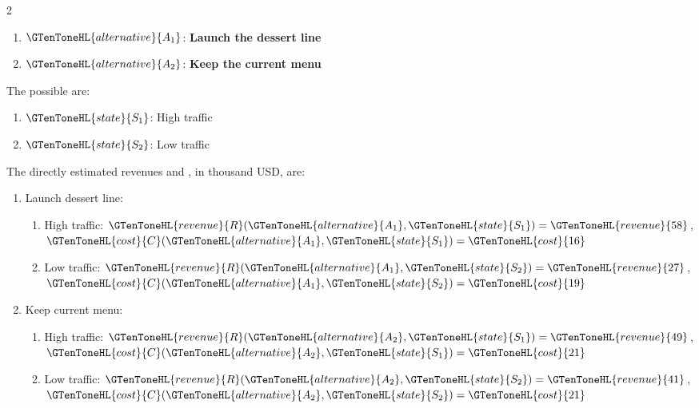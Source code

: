 \begin{multicols}{2}
	\begin{enumerate}[label=\arabic*.]
		\item \(\GTenToneHL{alternative}{A_1}\): \textbf{Launch the dessert line}
		\item \(\GTenToneHL{alternative}{A_2}\): \textbf{Keep the current menu}
	\end{enumerate}
	
	The possible    are:
	\begin{enumerate}[label=\arabic*.]
		\item \(\GTenToneHL{state}{S_1}\): High traffic
		\item \(\GTenToneHL{state}{S_2}\): Low traffic
	\end{enumerate}
	
	\columnbreak
	
	The directly estimated revenues and , in thousand USD, are:
	\begin{enumerate}[label=\arabic*.]
		\item Launch dessert line:
		\begin{enumerate}[label=\roman*)]
			\item High traffic:
			\(\GTenToneHL{revenue}{R}(\GTenToneHL{alternative}{A_1},\GTenToneHL{state}{S_1})=\GTenToneHL{revenue}{58}\), \(\GTenToneHL{cost}{C}(\GTenToneHL{alternative}{A_1},\GTenToneHL{state}{S_1})=\GTenToneHL{cost}{16}\)
			
			\item Low traffic:
			\(\GTenToneHL{revenue}{R}(\GTenToneHL{alternative}{A_1},\GTenToneHL{state}{S_2})=\GTenToneHL{revenue}{27}\), \(\GTenToneHL{cost}{C}(\GTenToneHL{alternative}{A_1},\GTenToneHL{state}{S_2})=\GTenToneHL{cost}{19}\)
		\end{enumerate}
		
		\item Keep current menu:
		\begin{enumerate}[label=\roman*)]
			\item High traffic:
			\(\GTenToneHL{revenue}{R}(\GTenToneHL{alternative}{A_2},\GTenToneHL{state}{S_1})=\GTenToneHL{revenue}{49}\), \(\GTenToneHL{cost}{C}(\GTenToneHL{alternative}{A_2},\GTenToneHL{state}{S_1})=\GTenToneHL{cost}{21}\)
			
			\item Low traffic:
			\(\GTenToneHL{revenue}{R}(\GTenToneHL{alternative}{A_2},\GTenToneHL{state}{S_2})=\GTenToneHL{revenue}{41}\), \(\GTenToneHL{cost}{C}(\GTenToneHL{alternative}{A_2},\GTenToneHL{state}{S_2})=\GTenToneHL{cost}{21}\)
		\end{enumerate}
	\end{enumerate}
\end{multicols}

